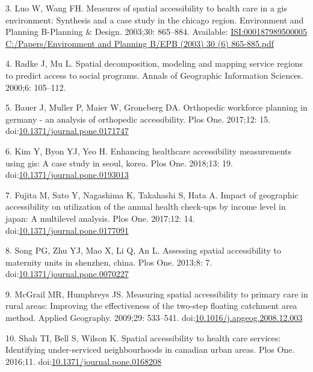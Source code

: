 \documentclass[10pt,letterpaper]{article}
\begin{document}
\hypertarget{ref-Luo2003}{}
3. Luo W, Wang FH. Measures of spatial accessibility to health care in a
gis environment: Synthesis and a case study in the chicago region.
Environment and Planning B-Planning \& Design. 2003;30: 865--884.
Available:
\href{ISI:000187989500005\%0AC:/Papers/Environment\%20and\%20Planning\%20B/EPB\%20(2003)\%2030\%20(6)\%20865-885.pdf}{ISI:000187989500005
C:/Papers/Environment and Planning B/EPB (2003) 30 (6) 865-885.pdf}

\hypertarget{ref-Radke2000}{}
4. Radke J, Mu L. Spatial decomposition, modeling and mapping service
regions to predict access to social programs. Annals of Geographic
Information Sciences. 2000;6: 105--112.

\hypertarget{ref-Bauer2017}{}
5. Bauer J, Muller P, Maier W, Groneberg DA. Orthopedic workforce
planning in germany - an analysis of orthopedic accessibility. Plos One.
2017;12: 15.
doi:\href{https://doi.org/10.1371/journal.pone.0171747}{10.1371/journal.pone.0171747}

\hypertarget{ref-Kim2018}{}
6. Kim Y, Byon YJ, Yeo H. Enhancing healthcare accessibility
measurements using gis: A case study in seoul, korea. Plos One. 2018;13:
19.
doi:\href{https://doi.org/10.1371/journal.pone.0193013}{10.1371/journal.pone.0193013}

\hypertarget{ref-Fujita2017}{}
7. Fujita M, Sato Y, Nagashima K, Takahashi S, Hata A. Impact of
geographic accessibility on utilization of the annual health check-ups
by income level in japan: A multilevel analysis. Plos One. 2017;12: 14.
doi:\href{https://doi.org/10.1371/journal.pone.0177091}{10.1371/journal.pone.0177091}

\hypertarget{ref-Song2013}{}
8. Song PG, Zhu YJ, Mao X, Li Q, An L. Assessing spatial accessibility
to maternity units in shenzhen, china. Plos One. 2013;8: 7.
doi:\href{https://doi.org/10.1371/journal.pone.0070227}{10.1371/journal.pone.0070227}

\hypertarget{ref-McGrail2009}{}
9. McGrail MR, Humphreys JS. Measuring spatial accessibility to primary
care in rural areas: Improving the effectiveness of the two-step
floating catchment area method. Applied Geography. 2009;29: 533--541.
doi:\href{https://doi.org/10.1016/j.apgeog.2008.12.003}{10.1016/j.apgeog.2008.12.003}

\hypertarget{ref-Shah2016}{}
10. Shah TI, Bell S, Wilson K. Spatial accessibility to health care
services: Identifying under-serviced neighbourhoods in canadian urban
areas. Plos One. 2016;11.
doi:\href{https://doi.org/10.1371/journal.pone.0168208}{10.1371/journal.pone.0168208}
\end{document}
